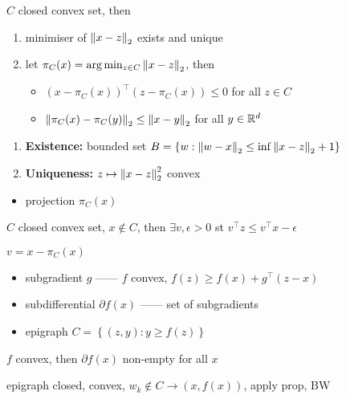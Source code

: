 \begin{prop}
    $C$ closed convex set, then
    \begin{enumerate}
        \item minimiser of $\left\lVert x- z\right\rVert_2$ exists and unique
        \item let $\pi_C(x) = \arg \min_{z \in C} \left\lVert x - z\right\rVert_2$, then
        \begin{itemize}
            \item $(x - \pi_C(x))^\top(z - \pi_C(x)) \leq 0$ for all $z \in C$
            \item $\left\lVert\pi_C(x) - \pi_C(y)\right\rVert_2 \leq \left\lVert x- y\right\rVert_2$ for all $y \in \mathbb{R}^d$
        \end{itemize}
    \end{enumerate}
\end{prop}
\begin{pf}
    \begin{enumerate}
        \item \textbf{Existence:} bounded set $B = \left\{ w : \left\lVert w - x\right\rVert_2 \leq \inf \left\lVert x- z\right\rVert_2 + 1 \right\}$
        \item \textbf{Uniqueness:} $z \mapsto \left\lVert x - z\right\rVert_2^2$ convex
    \end{enumerate}
\end{pf}

\begin{itemize}
    \item projection $\pi_C(x)$
\end{itemize}

\begin{prop}
    $C$ closed convex set, $x \notin C$, then $\exists v, \epsilon > 0$ st $v^\top z \leq v^\top x - \epsilon$
\end{prop}
\begin{pf}
    $v = x - \pi_{C}(x)$
\end{pf}

\begin{itemize}
    \item subgradient $g$ ------ $f$ convex, $f(z) \geq f(x) + g^\top (z -x)$
    \item subdifferential $\partial f(x)$ ------ set of subgradients
    \item epigraph $C = \left\{ (z, y) : y \geq f(z) \right\}$
\end{itemize}

\begin{prop}
    $f$ convex, then $\partial f(x)$ non-empty for all $x$
\end{prop}
\begin{pf}
    epigraph closed, convex, $w_k \notin C \rightarrow (x, f(x))$, apply prop, BW
\end{pf}

